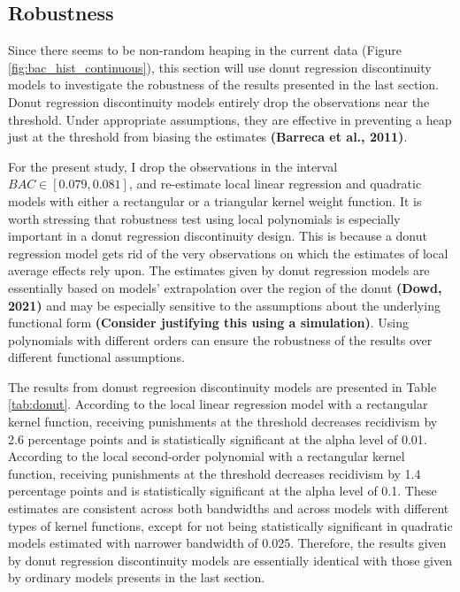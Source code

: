 \documentclass[
  11pt,
]{article}
\begin{document}
\endgroup

\hypertarget{robustness}{%
\subsection{Robustness}\label{robustness}}

Since there seems to be non-random heaping in the current data (Figure
\ref{fig:bac_hist_continuous}), this section will use donut regression
discontinuity models to investigate the robustness of the results
presented in the last section. Donut regression discontinuity models
entirely drop the observations near the threshold. Under appropriate
assumptions, they are effective in preventing a heap just at the
threshold from biasing the estimates \textbf{(Barreca et al., 2011)}.

For the present study, I drop the observations in the interval
\(BAC \in [0.079, 0.081]\), and re-estimate local linear regression and
quadratic models with either a rectangular or a triangular kernel weight
function. It is worth stressing that robustness test using local
polynomials is especially important in a donut regression discontinuity
design. This is because a donut regression model gets rid of the very
observations on which the estimates of local average effects rely upon.
The estimates given by donut regression models are essentially based on
models' extrapolation over the region of the donut \textbf{(Dowd, 2021)}
and may be especially sensitive to the assumptions about the underlying
functional form \textbf{(Consider justifying this using a simulation)}.
Using polynomials with different orders can ensure the robustness of the
results over different functional assumptions.

The results from donust regreesion discontinuity models are presented in
Table \ref{tab:donut}. According to the local linear regression model
with a rectangular kernel function, receiving punishments at the
threshold decreases recidivism by 2.6 percentage points and is
statistically significant at the alpha level of 0.01. According to the
local second-order polynomial with a rectangular kernel function,
receiving punishments at the threshold decreases recidivism by 1.4
percentage points and is statistically significant at the alpha level of
0.1. These estimates are consistent across both bandwidths and across
models with different types of kernel functions, except for not being
statistically significant in quadratic models estimated with narrower
bandwidth of 0.025. Therefore, the results given by donut regression
discontinuity models are essentially identical with those given by
ordinary models presents in the last section.
\end{document}
